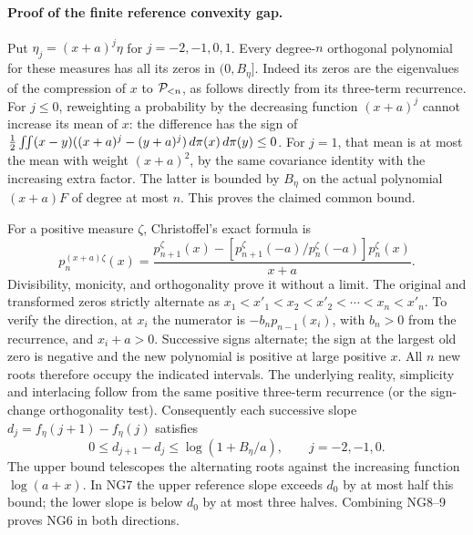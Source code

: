\documentclass[11pt]{article}
\begin{document}
\paragraph{Proof of the finite reference convexity gap.}
Put $\eta_j=(x+a)^j\eta$ for $j=-2,-1,0,1$.
Every degree-$n$ orthogonal polynomial for these measures has all its
zeros in $(0,B_\eta]$. Indeed its zeros are the eigenvalues of the
compression of $x$ to $\mathcal P_{<n}$, as follows directly from its three-term
recurrence. For $j\le0$, reweighting a probability by the decreasing
function $(x+a)^j$ cannot increase its mean of $x$: the difference
has the sign of
$\frac12\iint(x-y)((x+a)^j-(y+a)^j)\,d\pi(x)\,d\pi(y)\le0$.
For $j=1$, that mean is at most the mean with weight $(x+a)^2$, by
the same covariance identity with the increasing extra factor. The
latter is bounded by $B_\eta$ on the actual polynomial $(x+a)F$ of
degree at most $n$. This proves the claimed common bound.

For a positive measure $\zeta$, Christoffel's exact formula is
\[
 p_n^{(x+a)\zeta}(x)=
 \frac{p_{n+1}^{\zeta}(x)-
       [p_{n+1}^{\zeta}(-a)/p_n^{\zeta}(-a)]p_n^{\zeta}(x)}{x+a}.
\]
Divisibility, monicity, and orthogonality prove it without a limit.
The original and transformed zeros strictly alternate as
$x_1<x'_1<x_2<x'_2<\cdots<x_n<x'_n$.
To verify the direction, at $x_i$ the numerator is
$-b_n p_{n-1}(x_i)$, with $b_n>0$ from the recurrence, and $x_i+a>0$.
Successive signs alternate; the sign at the largest old zero is
negative and the new polynomial is positive at large positive $x$.
All $n$ new roots therefore occupy the indicated intervals. The
underlying reality, simplicity and interlacing follow from the same
positive three-term recurrence (or the sign-change orthogonality test).
Consequently each successive slope
$d_j=f_\eta(j+1)-f_\eta(j)$ satisfies
\[
 0\le d_{j+1}-d_j\le\log(1+B_\eta/a),\qquad j=-2,-1,0.
\]
The upper bound telescopes the alternating roots against the increasing
function $\log(a+x)$. In NG7 the upper reference slope exceeds $d_0$
by at most half this bound; the lower slope is below $d_0$ by at most
three halves. Combining NG8--9 proves NG6 in both directions.
\end{document}

